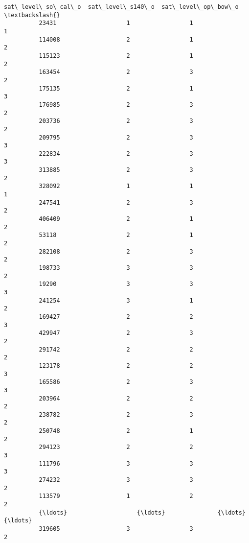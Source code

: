 \documentclass[11pt]{article}
\begin{document}
\begin{Verbatim}[commandchars=\\\{\}]
                  sat\_level\_so\_cal\_o  sat\_level\_s140\_o  sat\_level\_op\_bow\_o  \textbackslash{}
          23431                    1                 1                   1   
          114008                   2                 1                   2   
          115123                   2                 1                   2   
          163454                   2                 3                   2   
          175135                   2                 1                   3   
          176985                   2                 3                   2   
          203736                   2                 3                   2   
          209795                   2                 3                   3   
          222834                   2                 3                   3   
          313885                   2                 3                   2   
          328092                   1                 1                   1   
          247541                   2                 3                   2   
          406409                   2                 1                   2   
          53118                    2                 1                   2   
          282108                   2                 3                   2   
          198733                   3                 3                   2   
          19290                    3                 3                   3   
          241254                   3                 1                   2   
          169427                   2                 2                   3   
          429947                   2                 3                   2   
          291742                   2                 2                   2   
          123178                   2                 2                   3   
          165586                   2                 3                   3   
          203964                   2                 2                   2   
          238782                   2                 3                   2   
          250748                   2                 1                   2   
          294123                   2                 2                   3   
          111796                   3                 3                   3   
          274232                   3                 3                   2   
          113579                   1                 2                   2   
          {\ldots}                    {\ldots}               {\ldots}                 {\ldots}   
          319605                   3                 3                   2   

\end{Verbatim}
\end{document}
